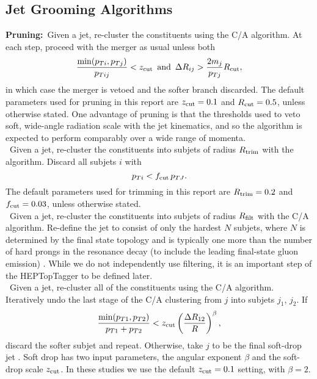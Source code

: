 \subsection{Jet Grooming Algorithms}
\label{sec:groomers}

 {\bf Pruning:}~Given a jet, re-cluster the constituents using the C/A algorithm. At each step, proceed with the merger as usual unless both
 \begin{equation}
 \frac{\mathrm{min}(p_{Ti},p_{Tj})}{p_{Tij}} < z_{\rm cut}\,\,\,\mathrm{and}\,\,\,\Delta R_{ij} > \frac{2m_j}{p_{Tj}} R_{\rm cut},
 \end{equation}
 in which case the merger is vetoed and the softer branch  discarded. The default parameters used for pruning \cite{Ellis:2009me} in this report are $z_{\rm cut}=0.1$ and $R_{\rm cut}=0.5$, unless otherwise stated. One advantage of pruning is that the thresholds used
 to veto soft, wide-angle radiation scale with the jet kinematics, and so the algorithm is expected to perform comparably over a wide range of momenta.\\

 ~Given a jet, re-cluster the constituents into subjets of radius $R_{\rm trim}$ with the \kT algorithm. Discard all subjets $i$ with 
 \begin{equation}
 p_{Ti} < f_{\rm cut} \, p_{TJ}.
 \end{equation}
 The default parameters used for trimming \cite{Krohn:2009th} in this report are $R_{\rm trim}=0.2$ and $f_{\rm cut}=0.03$, unless otherwise stated.\\
 
   ~Given a jet, re-cluster the constituents into subjets of radius $R_{\rm filt}$ with the C/A algorithm. Re-define the jet to consist of only the hardest $N$ subjets, where $N$ is determined by the final state topology and is typically one more than the number of hard prongs in the resonance decay (to include the leading final-state gluon emission) \cite{Butterworth:2008iy}. While we do not independently use filtering, it is an important step of the HEPTopTagger to be defined later.\\
 
 ~Given a jet, re-cluster all of the constituents using the C/A algorithm. Iteratively undo the last stage of the C/A clustering from $j$ into subjets $j_1$, $j_2$. If
 \begin{equation}
 \frac{\mathrm{min}(p_{T1},p_{T2})}{p_{T1}+p_{T2}} < z_{\rm cut} \left(\frac{\Delta R_{12}}{R}\right)^\beta,
 \end{equation}
 discard the softer subjet and repeat. Otherwise, take $j$ to be the final soft-drop jet \cite{Larkoski:2014wba}. Soft drop has two input parameters, the angular exponent $\beta$ and the soft-drop scale $z_{\rm cut}$. In these studies we use the default $z_{\rm cut}=0.1$ setting, with $\beta=2$.  

